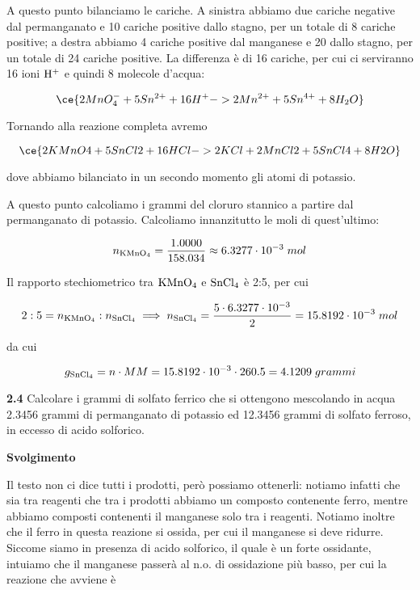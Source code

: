 A questo punto bilanciamo le cariche. A sinistra abbiamo due cariche negative dal permanganato e 10 cariche positive dallo stagno, per un totale di 8 cariche positive; a destra abbiamo 4 cariche positive dal manganese e 20 dallo stagno, per un totale di 24 cariche positive. La differenza è di 16 cariche, per cui ci serviranno 16 ioni $\rm H^+$ e quindi 8 molecole d'acqua: 

$$\ce{2MnO_4^- + 5Sn^{2+} + 16H^+ -> 2Mn^{2+} + 5Sn^{4+} + 8H_2O}$$

Tornando alla reazione completa avremo

$$\ce{2KMnO4 + 5SnCl2 + 16HCl -> 2KCl + 2MnCl2 + 5SnCl4 + 8H2O}$$

dove abbiamo bilanciato in un secondo momento gli atomi di potassio.

A questo punto calcoliamo i grammi del cloruro stannico a partire dal permanganato di potassio. Calcoliamo innanzitutto le moli di quest'ultimo:

$$n_{\rm KMnO_4}=\frac{1.0000}{158.034}
\approx 6.3277 \cdot 10^{-3}\;mol$$

Il rapporto stechiometrico tra $\rm KMnO_4$ e $\rm SnCl_4$ è 2:5, per cui 

$$2:5=n_{\rm KMnO_4}:n_{\rm SnCl_4}
\implies
n_{\rm SnCl_4}=\frac{5 \cdot 6.3277 \cdot 10^{-3}}{2}
=15.8192 \cdot 10^{-3}\;mol$$

da cui

$$g_{\rm SnCl_4}=n \cdot MM=15.8192 \cdot 10^{-3} \cdot 260.5=4.1209\;grammi$$

\vspace{0.2cm}\textbf{2.4} Calcolare i grammi di solfato ferrico che si ottengono mescolando in acqua 2.3456 grammi di permanganato di potassio  ed 12.3456 grammi di solfato ferroso, in eccesso di acido solforico.

\vspace{0.2cm}\large\textbf{Svolgimento}\normalsize

\vspace{0.2cm}Il testo non ci dice tutti i prodotti, però possiamo ottenerli: notiamo infatti che sia tra reagenti che tra i prodotti abbiamo un composto contenente ferro, mentre abbiamo composti contenenti il manganese solo tra i reagenti. Notiamo inoltre che il ferro in questa reazione si ossida, per cui il manganese si deve ridurre. Siccome siamo in presenza di acido solforico, il quale è un forte ossidante, intuiamo che il manganese passerà al n.o. di ossidazione più basso, per cui la reazione che avviene è

